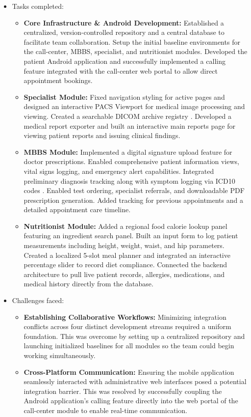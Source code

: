 \documentclass[onecolumn,journal]{IEEEtran}
\begin{document}
	\begin{itemize}
		
		\item Tasks completed:
		\begin{itemize}
			\item \textbf{Core Infrastructure \& Android Development:} Established a centralized, version-controlled repository and a central database to facilitate team collaboration. Setup the initial baseline environments for the call-center, MBBS, specialist, and nutritionist modules. Developed the patient Android application and successfully implemented a calling feature integrated with the call-center web portal to allow direct appointment bookings.
			\item \textbf{Specialist Module:} Fixed navigation styling for active pages and designed an interactive PACS Viewport \cite{pacs2001} for medical image processing and viewing. Created a searchable DICOM archive registry \cite{dicom2021}. Developed a medical report exporter and built an interactive main reports page for viewing patient reports and issuing clinical findings.
			\item \textbf{MBBS Module:} Implemented a digital signature upload feature for doctor prescriptions. Enabled comprehensive patient information views, vital signs logging, and emergency alert capabilities. Integrated preliminary diagnosis tracking along with symptom logging via ICD10 codes \cite{who2016icd10}. Enabled test ordering, specialist referrals, and downloadable PDF prescription generation. Added tracking for previous appointments and a detailed appointment care timeline.
			\item \textbf{Nutritionist Module:} Added a regional food calorie lookup panel featuring an ingredient search panel. Built an input form to log patient measurements including height, weight, waist, and hip parameters. Created a localized 5-slot meal planner and integrated an interactive percentage slider to record diet compliance. Connected the backend architecture to pull live patient records, allergies, medications, and medical history directly from the database.
		\end{itemize}
		
		\item Challenges faced:
		\begin{itemize}
			\item \textbf{Establishing Collaborative Workflows:} Minimizing integration conflicts across four distinct development streams required a uniform foundation. This was overcome by setting up a centralized repository and launching initialized baselines for all modules so the team could begin working simultaneously.
			\item \textbf{Cross-Platform Communication:} Ensuring the mobile application seamlessly interacted with administrative web interfaces posed a potential integration barrier. This was resolved by successfully coupling the Android application's calling feature directly into the web portal of the call-center module to enable real-time communication.
		\end{itemize}
		

\end{itemize}
\end{document}
